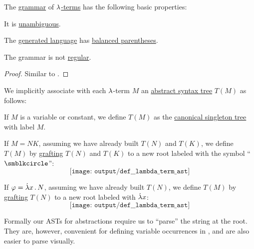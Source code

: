 \begin{proposition}\label{thm:lambda_term_grammar}
  The \hyperref[def:formal_grammar]{grammar} of \hyperref[def:lambda_term]{\( {\mathrm \lambda} \)-terms} has the following basic properties:
  \begin{thmenum}
     It is \hyperref[def:grammar_ambiguity]{unambiguous}.

     The \hyperref[def:formal_grammar/language]{generated language} has \hyperref[def:paired_delimiters]{balanced parentheses}.

     The grammar is not \hyperref[def:chomsky_hierarchy/regular]{regular}.
  \end{thmenum}
\end{proposition}
\begin{proof}
  Similar to .
\end{proof}

\begin{definition}\label{def:lambda_term_ast}\mimprovised
  We implicitly associate with each \( {\mathrm \lambda} \)-term \( M \) an \hyperref[con:abstract_syntax_tree]{abstract syntax tree} \( T(M) \) as follows:
  \begin{thmenum}
     If \( M \) is a variable or constant, we define \( T(M) \) as the \hyperref[def:canonical_singleton_tree]{canonical singleton tree} with label \( M \).

     If \( M = NK \), assuming we have already built \( T(N) \) and \( T(K) \), we define \( T(M) \) by \hyperref[def:ordered_tree_grafting_product]{grafting} \( T(N) \) and \( T(K) \) to a new root labeled with the symbol \enquote{\( \anon \)}:
    \begin{equation*}
      \texttt{[image: output/def\_\_lambda\_term\_ast]}
    \end{equation*}

     If \( \varphi = \qabs x N \), assuming we have already built \( T(N) \), we define \( T(M) \) by \hyperref[def:ordered_tree_grafting_product]{grafting} \( T(N) \) to a new root labeled with \( \mathord{\dot{{\mathrm \lambda}}} x \):
    \begin{equation*}
      \texttt{[image: output/def\_\_lambda\_term\_ast]}
    \end{equation*}
  \end{thmenum}
\end{definition}
\begin{comments}
  \item Formally our ASTs for abstractions require us to \enquote{parse} the string at the root. They are, however, convenient for defining variable occurrences in , and are also easier to parse visually.
\end{comments}

